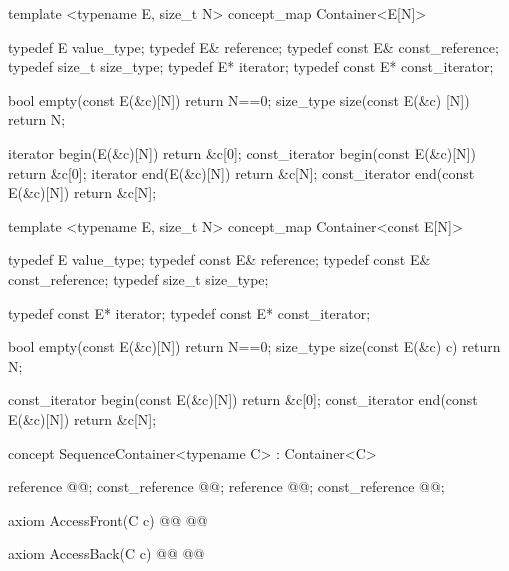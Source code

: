\documentclass[american,twoside]{book}
\begin{document}
\begin{itemdecl}
template <typename E, size_t N>
concept_map Container<E[N]> {
  typedef E                  value_type;
  typedef E&                 reference;
  typedef const E&           const_reference;
  typedef size_t             size_type;
  typedef E*                 iterator;
  typedef const E*           const_iterator;

  bool           empty(const E(&c)[N]) { return N==0; }
  size_type      size(const E(&c) [N]) { return N; }

  iterator       begin(E(&c)[N])       { return &c[0]; }
  const_iterator begin(const E(&c)[N]) { return &c[0]; }
  iterator       end(E(&c)[N])         { return &c[N]; }  
  const_iterator end(const E(&c)[N])   { return &c[N]; }
}
\end{itemdecl}

\begin{itemdecl}
template <typename E, size_t N>
concept_map Container<const E[N]> {
  typedef E                  value_type;
  typedef const E&           reference;
  typedef const E&           const_reference;
  typedef size_t             size_type;

  typedef const E*           iterator;
  typedef const E*           const_iterator;

  bool           empty(const E(&c)[N]) { return N==0; }
  size_type      size(const E(&c) c)   { return N; }

  const_iterator begin(const E(&c)[N]) { return &c[0]; }
  const_iterator end(const E(&c)[N])   { return &c[N]; }
}
\end{itemdecl}

\begin{itemdecl}
concept SequenceContainer<typename C> : Container<C> {
  reference       @@; 
  const_reference @@;
  reference       @@;
  const_reference @@;

  axiom AccessFront(C c) {
    @@
    @@
  }  

  axiom AccessBack(C c) {
    @@
    @@
  }
}
\end{itemdecl}


\begin{itemdescr}
\pnum
{} 
\end{itemdescr}
\end{document}
